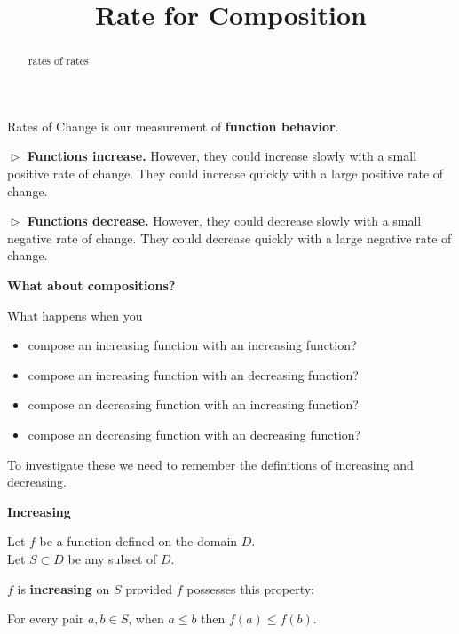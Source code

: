 \documentclass{ximera}
\title{Rate for Composition}
\begin{document}
\begin{abstract}
rates of rates
\end{abstract}
\maketitle




Rates of Change is our measurement of \textbf{function behavior}.


$\vartriangleright$  \textbf{\textcolor{blue!55!black}{Functions increase.}}  However, they could increase slowly with a small positive rate of change.  They could increase quickly with a large positive rate of change. 



$\vartriangleright$  \textbf{\textcolor{blue!55!black}{Functions decrease.}}  However, they could decrease slowly with a small negative rate of change.  They could decrease quickly with a large negative rate of change. 





\textbf{\textcolor{purple!85!blue}{What about compositions?}}





What happens when you


\begin{itemize}
\item compose an increasing function with an increasing function?
\item compose an increasing function with an decreasing function?
\item compose an decreasing function with an increasing function?
\item compose an decreasing function with an decreasing function?
\end{itemize}



To investigate these we need to remember the definitions of increasing and decreasing.






\begin{idea} \textbf{\textcolor{blue!55!black}{Increasing}} 


Let $f$ be a function defined on the domain $D$. \\
Let $S \subset D$ be any subset of $D$.

$f$ is \textbf{increasing} on $S$ provided $f$ possesses this property:  


\begin{center}
For every pair $a, b \in S$, when $a \leq b$ then $f(a) \leq f(b)$.
\end{center}

\end{idea}
\end{document}
